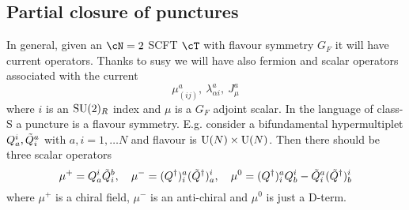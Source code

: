 \subsection{Partial closure of punctures}
In general, given an $\cN=2$ SCFT $\cT$ with flavour symmetry $G_F$ it will have current operators. Thanks to susy we will have also fermion and scalar operators associated with the current 
\begin{equation}
	\mu_{(ij)}^a,\ \lambda_{\alpha i}^a, \ J^a_\mu
\end{equation}
where $i$ is an $\mathrm{SU}(2)_R$ index and $\mu$ is a $G_F$ adjoint scalar. In the language of class-S a puncture is a flavour symmetry. E.g. consider a bifundamental hypermultiplet $Q_a^i,\Tilde{Q}_i^a$ with $a,i=1,\ldots N$ and flavour is $\mathrm{U}(N)\times \mathrm{U}(N)$. Then there should be three scalar operators
\begin{equation}
	\mu^+=Q_a^i\Tilde{Q}^b_i,\quad \mu^-=(Q^\dagger)^a_i(\Tilde{Q}^\dagger)^i_a,\quad \mu^0=(Q^\dagger)^a_i Q^i_b-\Tilde{Q}^a_i(\Tilde{Q}^\dagger)^i_b
\end{equation}
where $\mu^+$ is a chiral field, $\mu^-$ is an anti-chiral and $\mu^0$ is just a D-term.